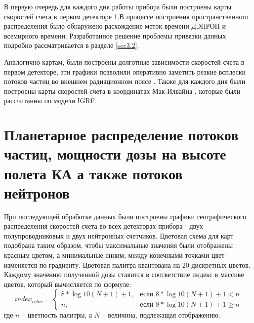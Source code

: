 В первую очередь для каждого дня работы прибора были построены карты скоростей счета в первом детекторе \ref{sec:planetDose}.В процессе построения пространственного распределения было обнаружено расхождение меток времени  ДЭПРОН и всемирного времени. Разработанное решение проблемы привязки данных подробно рассматривается в разделе \ref{sec3.2}.

Аналогично картам, были построены долготные зависимости скоростей счета в первом детекторе, эти графики позволили оперативно заметить резкие всплески потоков частиц во внешнем радиационном поясе \label{sec:flash_analisys}. Также для каждого дня были построены карты скоростей счета в координатах Мак-Илвайна \cite{McIlwain1961}, которые были рассчитанны по модели IGRF.

\section{Планетарное распределение потоков частиц, мощности дозы на высоте полета КА а также потоков нейтронов} \label{sec:planetDose}
При последующей обработке данных были построены графики географического распределения скоростей счета во всех детекторах прибора - двух полупроводниковых и двух нейтронных счетчиков. Цветовая схема для карт подобрана таким образом, чтобы максимальные значения были отображены красным цветом, а минимальные синим, между конечными точками цвет изменяется по градиенту. Цветовая палитра квантована на 20 дискретных цветов. Каждому значению полученной дозы ставится в соответствие индекс в массиве цветов, который вычисляется по формуле:
\begin{equation*}
index_{color} = \begin{cases}
	8*\log{10}(N + 1)+1,  & \text{если } 8*\log{10}(N + 1) +1 < n \\
	n,  & \text{если } 8*\log{10}(N + 1) +1 \ge n
	\end{cases}
\end{equation*}
		где $ n $ -- цветность палитры, а $ N $ -- величина, подлежащая отображению.
						
